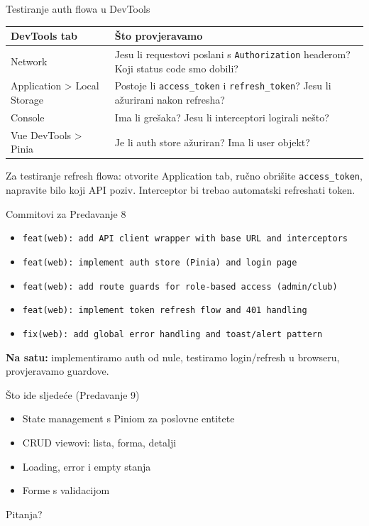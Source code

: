 \begin{frame}{Testiranje auth flowa u DevTools}
\begin{tabular}{@{}lp{8cm}@{}}
  \toprule
  \textbf{DevTools tab} & \textbf{Što provjeravamo} \\
  \midrule
  Network & Jesu li requestovi poslani s \texttt{Authorization} headerom? Koji status code smo dobili? \\
  Application > Local Storage & Postoje li \texttt{access\_token} i \texttt{refresh\_token}? Jesu li ažurirani nakon refresha? \\
  Console & Ima li grešaka? Jesu li interceptori logirali nešto? \\
  Vue DevTools > Pinia & Je li auth store ažuriran? Ima li user objekt? \\
  \bottomrule
\end{tabular}

\vspace{0.6em}
Za testiranje refresh flowa: otvorite Application tab, ručno obrišite \texttt{access\_token}, napravite bilo koji API poziv. Interceptor bi trebao automatski refreshati token.
\end{frame}

\begin{frame}{Commitovi za Predavanje 8}
\begin{itemize}
  \item \texttt{feat(web): add API client wrapper with base URL and interceptors}
  \item \texttt{feat(web): implement auth store (Pinia) and login page}
  \item \texttt{feat(web): add route guards for role-based access (admin/club)}
  \item \texttt{feat(web): implement token refresh flow and 401 handling}
  \item \texttt{fix(web): add global error handling and toast/alert pattern}
\end{itemize}

\vspace{0.4em}
\textbf{Na satu:} implementiramo auth od nule, testiramo login/refresh u browseru, provjeravamo guardove.
\end{frame}

\begin{frame}{Što ide sljedeće (Predavanje 9)}
\begin{itemize}
  \item State management s Piniom za poslovne entitete
  \item CRUD viewovi: lista, forma, detalji
  \item Loading, error i empty stanja
  \item Forme s validacijom
\end{itemize}

\vspace{0.8em}
\begin{center}
\Large Pitanja?
\end{center}
\end{frame}


